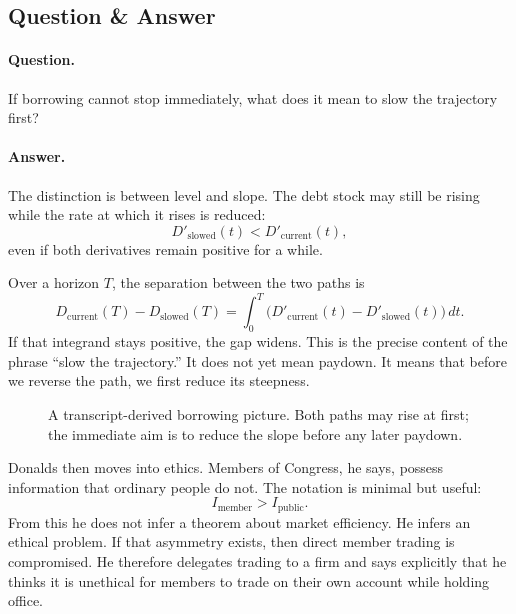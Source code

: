 \subsection{Question \& Answer}

\paragraph{Question.} If borrowing cannot stop immediately, what does it mean to slow the trajectory first?

\paragraph{Answer.} The distinction is between level and slope. The debt stock may still be rising while the rate at which it rises is reduced:
\begin{equation}
D'_{\text{slowed}}(t)<D'_{\text{current}}(t),
\end{equation}
even if both derivatives remain positive for a while.

Over a horizon $T$, the separation between the two paths is
\begin{equation}
D_{\text{current}}(T)-D_{\text{slowed}}(T)
=
\int_0^T \bigl(D'_{\text{current}}(t)-D'_{\text{slowed}}(t)\bigr)\,dt.
\end{equation}
If that integrand stays positive, the gap widens. This is the precise content of the phrase ``slow the trajectory.'' It does not yet mean paydown. It means that before we reverse the path, we first reduce its steepness.

\begin{figure}[h]
\centering
{}
\caption{A transcript-derived borrowing picture. Both paths may rise at first; the immediate aim is to reduce the slope before any later paydown.}
\end{figure}

Donalds then moves into ethics. Members of Congress, he says, possess information that ordinary people do not. The notation is minimal but useful:
\begin{equation}
I_{\text{member}} > I_{\text{public}}.
\end{equation}
From this he does not infer a theorem about market efficiency. He infers an ethical problem. If that asymmetry exists, then direct member trading is compromised. He therefore delegates trading to a firm and says explicitly that he thinks it is unethical for members to trade on their own account while holding office.

